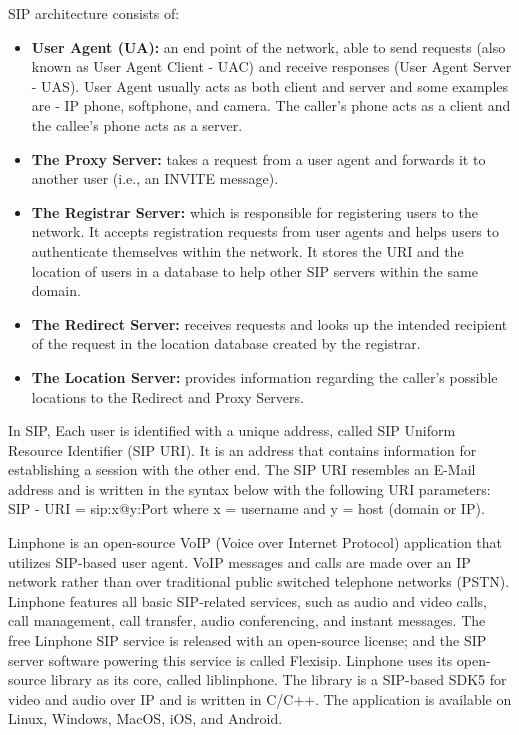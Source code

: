     \noindent SIP architecture consists of:
    \begin{itemize}
        \item \textbf {User Agent (UA):} an end point of the network, able to send requests (also known as User Agent Client - UAC) 
        and receive responses (User Agent Server - UAS). User Agent usually acts as both client and server and some examples 
        are - IP phone, softphone, and camera. The caller’s phone acts as a client and the callee’s phone acts as a server.
        \item \textbf {The Proxy Server:} takes a request from a user agent and forwards it to another user (i.e., an INVITE message).
        \item \textbf {The Registrar Server:} which is responsible for registering users to the network. It accepts registration requests from 
        user agents and helps users to authenticate themselves within the network. It stores the URI and the location of users in a database 
        to help other SIP servers within the same domain.
        \item \textbf {The Redirect Server:} receives requests and looks up the intended recipient of the request in the location database created by the registrar. 
        \item \textbf {The Location Server:} provides information regarding the caller’s possible locations to the Redirect and Proxy Servers.
    \end{itemize}
    \noindent In SIP, Each user is identified with a unique address, called SIP Uniform Resource Identifier (SIP URI). It is an address that contains information for establishing a session with the other end. The SIP URI resembles an E-Mail address and is written in the syntax below with the following URI parameters: 
    SIP - URI = sip:x@y:Port  where x = username and y = host (domain or IP).

    Linphone is an open-source VoIP (Voice over Internet Protocol) application that utilizes SIP-based user agent. VoIP messages and calls are made over an IP network rather than over traditional public switched telephone networks (PSTN). 
    Linphone features all basic SIP-related services, such as audio and video calls, call management, call transfer, audio conferencing, and instant messages. 
    The free Linphone SIP service is released with an open-source license; and the SIP server software powering this service is called Flexisip. 
    Linphone uses its open-source library as its core, called liblinphone. 
    The library is a SIP-based SDK5 for video and audio over IP and is written in C/C++. 
    The application is available on Linux, Windows, MacOS, iOS, and Android.

